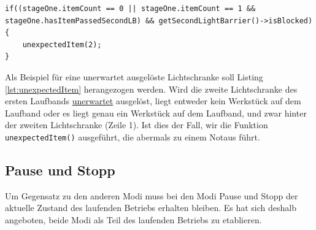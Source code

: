 \documentclass[fontsize=11pt,a4paper,final]{scrartcl}[2003/01/01]
\begin{document}
\begin{lstlisting}[caption={Beispiel: Zweite Lichtschranke wird unerwartet ausgelöst},label={lst:unexpectedItem}]
if((stageOne.itemCount == 0 || stageOne.itemCount == 1 && stageOne.hasItemPassedSecondLB) && getSecondLightBarrier()->isBlocked)
{
	unexpectedItem(2);
}
\end{lstlisting}
Als Beispiel für eine unerwartet ausgelöste Lichtschranke soll Listing \ref{lst:unexpectedItem} herangezogen werden. Wird die zweite Lichtschranke des ersten Laufbands \underline{unerwartet} ausgelöst, liegt entweder kein Werkstück auf dem Laufband oder es liegt genau ein Werkstück auf dem Laufband, und zwar hinter der zweiten Lichtschranke (Zeile 1). Ist dies der Fall, wir die Funktion \lstinline|unexpectedItem()| ausgeführt, die abermals zu einem Notaus führt.

\subsection{Pause und Stopp}
Um Gegensatz zu den anderen Modi muss bei den Modi Pause und Stopp der aktuelle Zustand des laufenden Betriebs erhalten bleiben. Es hat sich deshalb angeboten, beide Modi als Teil des laufenden Betriebs zu etablieren.
\end{document}
